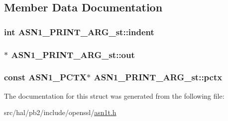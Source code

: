 \subsection{Member Data Documentation}
\subsubsection[{\texorpdfstring{indent}{indent}}]{\setlength{\rightskip}{0pt plus 5cm}int A\+S\+N1\+\_\+\+P\+R\+I\+N\+T\+\_\+\+A\+R\+G\+\_\+st\+::indent}\hypertarget{struct_a_s_n1___p_r_i_n_t___a_r_g__st_a62f3360ea4704ea92e62e0a4c28d238f}{}\label{struct_a_s_n1___p_r_i_n_t___a_r_g__st_a62f3360ea4704ea92e62e0a4c28d238f}
\subsubsection[{\texorpdfstring{out}{out}}]{$\ast$ A\+S\+N1\+\_\+\+P\+R\+I\+N\+T\+\_\+\+A\+R\+G\+\_\+st\+::out}\hypertarget{struct_a_s_n1___p_r_i_n_t___a_r_g__st_a238eca48eea38372c40de60fbdc4d4ee}{}\label{struct_a_s_n1___p_r_i_n_t___a_r_g__st_a238eca48eea38372c40de60fbdc4d4ee}
\subsubsection[{\texorpdfstring{pctx}{pctx}}]{\setlength{\rightskip}{0pt plus 5cm}const {\bf A\+S\+N1\+\_\+\+P\+C\+TX}$\ast$ A\+S\+N1\+\_\+\+P\+R\+I\+N\+T\+\_\+\+A\+R\+G\+\_\+st\+::pctx}\hypertarget{struct_a_s_n1___p_r_i_n_t___a_r_g__st_a6ef7daafd5db8eeb310b27206b3b243a}{}\label{struct_a_s_n1___p_r_i_n_t___a_r_g__st_a6ef7daafd5db8eeb310b27206b3b243a}


The documentation for this struct was generated from the following file\+:\begin{DoxyCompactItemize}
\item 
src/hal/pb2/include/openssl/\hyperlink{asn1t_8h}{asn1t.\+h}\end{DoxyCompactItemize}
